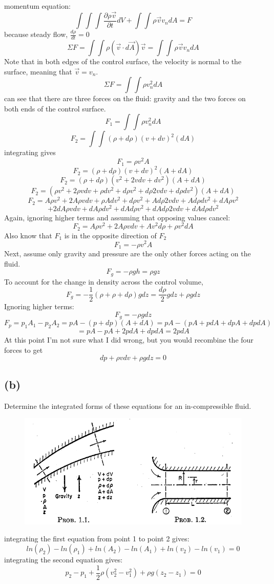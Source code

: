 \documentclass[preview,12pt]{article}
\begin{document}
    \noindent momentum equation:
    $$\int\int\int\frac{\partial \rho \vec{v}}{\partial t}dV+\int\int\rho\vec{v}v_ndA=F$$
    because steady flow, $\frac{d\rho}{dt}=0$
    $$\Sigma F=\int\int\rho(\vec{v} \cdot d\vec{A})\vec{v}=\int\int\rho\vec{v}v_ndA$$
    Note that in both edges of the control surface, the velocity is normal to the surface, meaning that $\vec{v}=v_n$.
    $$\Sigma F=\int\int\rho v_n^2dA$$
    can see that there are three forces on the fluid: gravity and the two forces on both ends of the control surface. 
    $$F_1=\int\int\rho v_n^2dA$$
    $$F_2=\int\int(\rho+d\rho)(v+dv)^2(dA)$$
    integrating gives
    $$F_1=\rho v^2 A$$
    $$F_2=(\rho+d\rho)(v+dv)^2(A+dA)$$
    $$F_2=(\rho+d\rho)(v^2+2vdv+dv^2)(A+dA)$$
    $$F_2=(\rho v^2 +2\rho vdv+\rho dv^2+d\rho v^2+d\rho 2 vdv+d\rho dv^2)(A+dA)$$
    $$F_2=A\rho v^2 +2A\rho vdv+\rho Adv^2+d\rho v^2+Ad\rho 2 vdv+Ad\rho dv^2+dA\rho v^2 $$
    $$+2dA\rho vdv+dA\rho dv^2+dAd\rho v^2+dAd\rho 2 vdv+dAd\rho dv^2$$
    Again, ignoring higher terms and assuming that opposing values cancel:
    $$F_2=A\rho v^2+2A\rho vdv+Av^2d\rho +\rho v^2dA$$
    Also know that $F_1$ is in the opposite direction of $F_2$
    $$F_1=-\rho v^2 A$$
    Next, assume only gravity and pressure are the only other forces acting on the fluid.  
    $$F_g=-\rho g h=\rho g z$$
    To account for the change in density across the control volume,
    $$F_g=-\frac{1}{2}(\rho+\rho+d\rho) g dz=\frac{d\rho}{2}gdz+\rho gdz$$
    Ignoring higher terms:
    $$F_g=-\rho g dz$$
    $$F_p=p_1A_1-p_2A_2=pA-(p+dp)(A+dA)=pA-(pA+pdA+dpA+dpdA)$$
    $$=pA-pA+2pdA+dpdA=2pdA$$
    At this point I'm not sure what I did wrong, but you would recombine the four forces to get 
    $$dp+\rho v dv+\rho g dz=0$$
    
    
    
    \subsection*{(b)} 
    Determine the integrated forms of these equations for an in-compressible fluid.
    \begin{figure}
        \includegraphics[width=\textwidth]{HW1_1and2.PNG}
        \centering
    \end{figure}
    \newline
    integrating the first equation from point 1 to point 2 gives:
    $$ln(\rho_2)-ln(\rho_1)+ln(A_2)-ln(A_1)+ln(v_2)-ln(v_1)=0$$
    integrating the second equation gives:
    $$p_2-p_1+\frac{1}{2}\rho(v_2^2-v_1^2)+\rho g(z_2-z_1)=0$$
    
\end{document}
